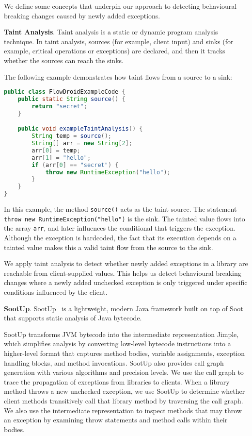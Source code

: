 We define some concepts that underpin our approach to detecting
behavioural breaking changes caused by newly added exceptions.

\textbf{Taint Analysis}. Taint analysis is a static or dynamic program analysis technique.
In taint analysis, sources (for example, client input) and sinks (for example, critical
operations or exceptions) are declared, and then it tracks whether the sources can reach the sinks.

The following example demonstrates how taint flows from a source to a sink:

\begin{lstlisting}[language=java,basicstyle=\scriptsize\ttfamily]
public class FlowDroidExampleCode {
    public static String source() {
        return "secret";
    }

    public void exampleTaintAnalysis() {
        String temp = source();
        String[] arr = new String[2];
        arr[0] = temp;
        arr[1] = "hello";
        if (arr[0] == "secret") {
            throw new RuntimeException("hello");
        }
    }
}
\end{lstlisting}

In this example, the method \texttt{source()} acts as the taint source. The statement \texttt{throw new RuntimeException("hello")} is the sink. The tainted value flows into the array \texttt{arr}, and later influences the conditional that triggers the exception. Although the exception is hardcoded, the fact that its execution depends on a tainted value makes this a valid taint flow from the source to the sink.

We apply taint analysis to detect whether newly added exceptions in a library are reachable from client-supplied values. This helps us detect behavioural breaking changes where a newly added unchecked exception is only triggered under specific conditions influenced by the client.

\textbf{SootUp}. SootUp~\cite{Karakaya24:_sootup} is a lightweight, modern Java framework built on top of Soot~\cite{vallee2010soot} that supports static analysis of Java bytecode.

SootUp transforms JVM bytecode into the intermediate representation Jimple, which simplifies analysis by converting low-level bytecode instructions into a higher-level format that captures method bodies, variable assignments, exception handling blocks, and method invocations. SootUp also provides call graph generation with various algorithms and precision levels. We use the call graph to trace the propagation of exceptions from libraries to clients. When a library method throws a new unchecked exception, we use SootUp to determine whether client methods transitively call that library method by traversing the call graph. We also use the intermediate representation to inspect methods that may throw an exception by examining throw statements and method calls within their bodies.


